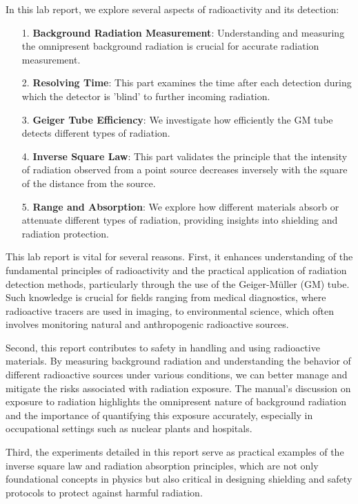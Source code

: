\documentclass[11pt]{article}
\begin{document}
	In this lab report, we explore several aspects of radioactivity and its detection:
	\begin{enumerate}
		\item[1.] \textbf{Background Radiation Measurement}: Understanding and measuring the omnipresent background radiation is crucial for accurate radiation measurement.
		\item[2.] \textbf{Resolving Time}: This part examines the time after each detection during which the detector is 'blind' to further incoming radiation.
		\item[3.] \textbf{Geiger Tube Efficiency}: We investigate how efficiently the GM tube detects different types of radiation.
		\item[4.] \textbf{Inverse Square Law}: This part validates the principle that the intensity of radiation observed from a point source decreases inversely with the square of the distance from the source.
		\item[5.] \textbf{Range and Absorption}: We explore how different materials absorb or attenuate different types of radiation, providing insights into shielding and radiation protection.
	\end{enumerate}	
	This lab report is vital for several reasons. First, it enhances understanding of the fundamental principles of radioactivity and the practical application of radiation detection methods, particularly through the use of the Geiger-Müller (GM) tube. Such knowledge is crucial for fields ranging from medical diagnostics, where radioactive tracers are used in imaging, to environmental science, which often involves monitoring natural and anthropogenic radioactive sources.
	
	Second, this report contributes to safety in handling and using radioactive materials. By measuring background radiation and understanding the behavior of different radioactive sources under various conditions, we can better manage and mitigate the risks associated with radiation exposure. The manual’s discussion on exposure to radiation highlights the omnipresent nature of background radiation and the importance of quantifying this exposure accurately, especially in occupational settings such as nuclear plants and hospitals.
	
	Third, the experiments detailed in this report serve as practical examples of the inverse square law and radiation absorption principles, which are not only foundational concepts in physics but also critical in designing shielding and safety protocols to protect against harmful radiation.
	
\end{document}
